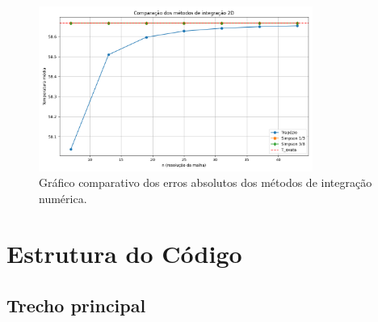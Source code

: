 \documentclass[12pt]{article}
\begin{document}
\begin{figure}[H]
    \centering
    \includegraphics[width=0.8\textwidth]{img/Figure_1.png}
    \caption{Gráfico comparativo dos erros absolutos dos métodos de integração numérica.}
\end{figure}

\section{Estrutura do Código}

\subsection*{Trecho principal}
\end{document}
